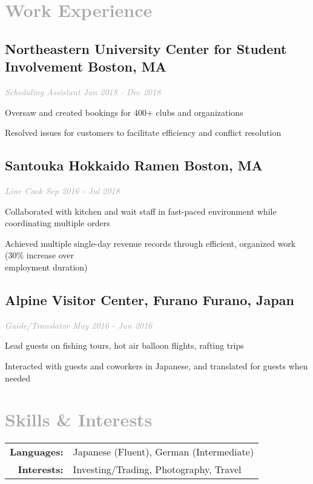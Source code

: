 \documentclass{article}
\begin{document}
{\section[Work Experience \hfill]{\textcolor{darkgray}{Work Experience \sout{\hfill}}}
    \subsection{{\bfseries\large Northeastern University Center for Student Involvement} \hfill Boston, MA}
    \textit{\textcolor{darkgray}{Scheduling Assistant \hfill \textit{Jun 2018 - Dec 2018}}}
    \begin{myitemize}
        \item Oversaw and created bookings for 400+ clubs and organizations
        \item Resolved issues for customers to facilitate efficiency and conflict resolution
    \end{myitemize}
    \subsection{{\bfseries\large Santouka Hokkaido Ramen} \hfill Boston, MA}
    \textit{\textcolor{darkgray}{Line Cook \hfill \textit{Sep 2016 - Jul 2018}}}
    \begin{myitemize}
        \item Collaborated with kitchen and wait staff in fast-paced environment while coordinating multiple orders
        \item Achieved multiple single-day revenue records through efficient, organized work (30\% increase over\\
        employment duration)
    \end{myitemize}
    \subsection{{\bfseries\large Alpine Visitor Center, Furano} \hfill Furano, Japan}
    \textit{\textcolor{darkgray}{Guide/Translator \hfill \textit{May 2016 - Jun 2016}}}
    \begin{myitemize}
        \item Lead guests on fishing tours, hot air balloon flights, rafting trips
        \item Interacted with guests and coworkers in Japanese, and translated for guests when needed
    \end{myitemize}
    
\section[Skills \& Interests \hfill]{\textcolor{darkgray}{Skills \& Interests \sout{\hfill}}}
    \begin{tabular}{rl}
        {\bfseries Languages: }&Japanese (Fluent), German (Intermediate)\\
        {\bfseries Interests: }&Investing/Trading, Photography, Travel
    \end{tabular}
}%
\end{document}
